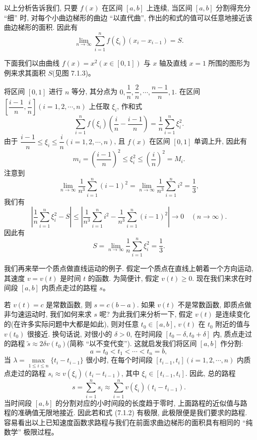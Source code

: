 \documentclass[UTF8,12pt,a4paper,fontset=fandol]{ctexart}
\begin{document}
以上分析告诉我们, 只要 $f(x)$ 在区间 $[a,b]$ 上连续, 当区间 $[a,b]$ 分割得充分 ``细'' 时, 对每个小曲边梯形的曲边 ``以直代曲'', 作出的和式的值可以任意地接近该曲边梯形的面积. 因此有
\[
  \lim_{n\to\infty}\sum_{i=1}^n f(\xi_i)(x_i-x_{i-1})=S.
\]

下面我们以由曲线 $f(x)=x^2(x\in[0,1])$ 与 $x$ 轴及直线 $x=1$ 所围的图形为例来求其面积 $S$(见图 7.1.3)。

将区间 $[0,1]$ 进行 $n$ 等分, 其分点为 $0,\dfrac1n,\dfrac2n,\cdots,\dfrac{n-1}{n},1$. 在区间 $\left[\dfrac{i-1}{n},\dfrac{i}{n}\right](i=1,2,\cdots,n)$ 上任取 $\xi_i$, 作和式
\[
  \sum_{i=1}^n f(\xi_i)\left(\frac{i}{n}-\frac{i-1}{n}\right)
  =\frac1n\sum_{i=1}^n \xi_i^2.
\]
由于 $\dfrac{i-1}{n}\leq \xi_i\leq \dfrac{i}{n}(i=1,2,\cdots,n)$, 且 $f(x)$ 在区间 $[0,1]$ 单调上升, 因此有
\[
  m_i=\left(\frac{i-1}{n}\right)^2\leq \xi_i^2\leq \left(\frac{i}{n}\right)^2=M_i.
\]
注意到
\[
  \lim_{n\to\infty}\frac1{n^3}\sum_{i=1}^n (i-1)^2
  =\lim_{n\to\infty}\frac1{n^3}\sum_{i=1}^n i^2
  =\frac13,
\]
我们有
\[
  \left|\frac1n\sum_{i=1}^n \xi_i^2-S\right|
  \leq \left|\frac1{n^3}\sum_{i=1}^n i^2-\frac1{n^3}\sum_{i=1}^n (i-1)^2\right|
  \to 0\quad(n\to\infty).
\]
因此有
\[
  S=\lim_{n\to\infty}\frac1n\sum_{i=1}^n \xi_i^2=\frac13.
\]

我们再来举一个质点做直线运动的例子. 假定一个质点在直线上朝着一个方向运动, 其速度 $v=v(t)$ 是时间 $t$ 的函数. 为简便计, 假定 $v(t)\geq 0$. 现在我们来求在时间段 $[a,b]$ 内质点走过的路程 $s$。

若 $v(t)=c$ 是常数函数, 则 $s=c(b-a)$. 如果 $v(t)$ 不是常数函数, 即质点做非匀速运动时, 我们如何来求 $s$ 呢? 为此我们来分析一下, 假定 $v(t)$ 是连续变化的(在许多实际问题中大都是如此), 则对任意 $t_0\in[a,b]$, $v(t)$ 在 $t_0$ 附近的值与 $v(t_0)$ 很接近. 换句话说, 对很小的 $\delta>0$, 在时间段 $[t_0-\delta,t_0+\delta]$ 内, 质点走过的路程 $\tilde s\approx 2\delta v(t_0)$(简称 ``以不变代变''). 这就启发我们将区间 $[a,b]$ 作分割:
\[
  a=t_0<t_1<\cdots<t_n=b,
\]
当 $\lambda=\max\limits_{1\leq i\leq n}\{t_i-t_{i-1}\}$ 很小时, 在每个时间段 $[t_{i-1},t_i](i=1,2,\cdots,n)$ 内质点走过的路程 $s_i\approx v(\xi_i)(t_i-t_{i-1})$, 其中 $\xi_i\in[t_{i-1},t_i]$. 因此, 总的路程
\begin{equation}
  s=\sum_{i=1}^n s_i\approx \sum_{i=1}^n v(\xi_i)(t_i-t_{i-1}).
  \tag{7.1.2}
\end{equation}
当时间段 $[a,b]$ 的分割对应的小时间段的长度趋于零时, 上面路程的近似值与路程的准确值无限地接近. 因此若和式 (7.1.2) 有极限, 此极限便是我们要求的路程. 容易看出以上已知速度函数求路程与我们在前面求曲边梯形的面积具有相同的 ``纯数学'' 极限过程。
\end{document}
